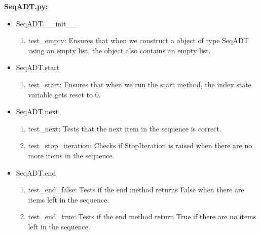 \documentclass[12pt]{article}
\begin{document}
\textbf{SeqADT.py:}
\begin{itemize}

  \item SeqADT.\_\_init\_\_
    \begin{enumerate}
      \item test\_empty: Ensures that when we construct a object of type SeqADT using an empty list,
      the object also contains an empty list.
    \end{enumerate}

  \item SeqADT.start
    \begin{enumerate}
      \item test\_start: Ensures that when we run the start method, the index state variable gets reset to 0.
    \end{enumerate}

  \item SeqADT.next
    \begin{enumerate}
      \item test\_next: Tests that the next item in the sequence is correct.
      \item test\_stop\_iteration: Checks if StopIteration is raised when there are no more items in the sequence.
    \end{enumerate}

  \item SeqADT.end
    \begin{enumerate}
      \item test\_end\_false: Tests if the end method returns False when there are items left in the sequence.
      \item test\_end\_true: Tests if the end method return True if there are no items left in the sequence.
    \end{enumerate}

\end{itemize}
\medskip
\end{document}
